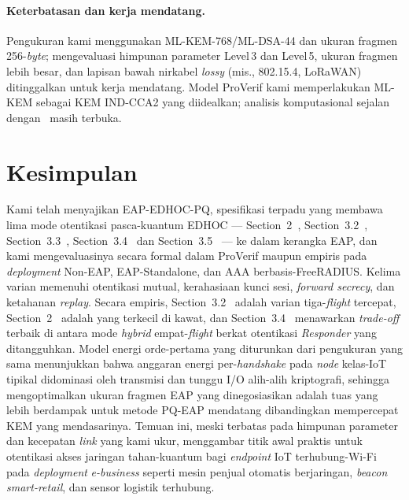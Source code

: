 \documentclass{easychair}
\newcommand{\VarSec}[1]{Section~#1~\cite{pq-edhoc-draft}}
\begin{document}
\paragraph{Keterbatasan dan kerja mendatang.}
Pengukuran kami menggunakan ML-KEM-768/ML-DSA-44 dan ukuran fragmen
256-\emph{byte}; mengevaluasi himpunan parameter Level\,3 dan
Level\,5, ukuran fragmen lebih besar, dan lapisan bawah nirkabel
\emph{lossy} (mis., 802.15.4, LoRaWAN) ditinggalkan untuk kerja
mendatang. Model ProVerif kami memperlakukan ML-KEM sebagai KEM
IND-CCA2 yang diidealkan; analisis komputasional sejalan
dengan~\cite{Fer24,GM23} masih terbuka.


\section{Kesimpulan}
\label{conclusion}
Kami telah menyajikan EAP-EDHOC-PQ, spesifikasi terpadu yang membawa
lima mode otentikasi pasca-kuantum EDHOC --- \VarSec{2}, \VarSec{3.2},
\VarSec{3.3}, \VarSec{3.4} dan \VarSec{3.5} --- ke dalam kerangka
EAP, dan kami mengevaluasinya secara formal dalam ProVerif maupun
empiris pada \emph{deployment} Non-EAP, EAP-Standalone, dan AAA
berbasis-FreeRADIUS. Kelima varian memenuhi otentikasi mutual,
kerahasiaan kunci sesi, \emph{forward secrecy}, dan ketahanan
\emph{replay}. Secara empiris, \VarSec{3.2} adalah varian
tiga-\emph{flight} tercepat, \VarSec{2} adalah yang terkecil di kawat,
dan \VarSec{3.4} menawarkan \emph{trade-off} terbaik di antara mode
\emph{hybrid} empat-\emph{flight} berkat otentikasi \emph{Responder}
yang ditangguhkan. Model energi orde-pertama yang diturunkan dari
pengukuran yang sama menunjukkan bahwa anggaran energi
per-\emph{handshake} pada \emph{node} kelas-IoT tipikal didominasi
oleh transmisi dan tunggu I/O alih-alih kriptografi, sehingga
mengoptimalkan ukuran fragmen EAP yang dinegosiasikan adalah tuas
yang lebih berdampak untuk metode PQ-EAP mendatang dibandingkan
mempercepat KEM yang mendasarinya. Temuan ini, meski terbatas pada
himpunan parameter dan kecepatan \emph{link} yang kami ukur, menggambar
titik awal praktis untuk otentikasi akses jaringan tahan-kuantum bagi
\emph{endpoint} IoT terhubung-Wi-Fi pada \emph{deployment} \emph{e-business}
seperti mesin penjual otomatis berjaringan, \emph{beacon}
\emph{smart-retail}, dan sensor logistik terhubung.


\label{sect:bib}


\end{document}

